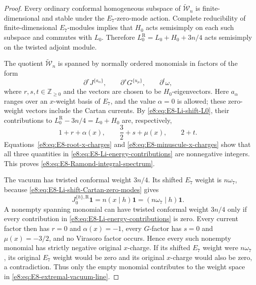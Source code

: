 \documentclass[11pt,reqno]{amsart}
\theoremstyle{definition}
\theoremstyle{remark}
\providecommand{\Z}{\mathbb{Z}}
\providecommand{\Vac}{\mathbf{1}}
\providecommand{\W}{\mathcal{W}}
\begin{document}
\begin{proof}
Every ordinary conformal homogeneous subspace of $\widetilde{\W}_n$ is
finite-dimensional and stable under the $E_7$-zero-mode action.  Complete
reducibility of finite-dimensional $E_7$-modules implies that $H_0$ acts
semisimply on each such subspace and commutes with $L_0$.  Therefore
$L_0^{\mathrm R}=L_0+H_0+3n/4$ acts semisimply on the twisted adjoint
module.

The quotient $\widetilde{\W}_n$ is spanned by normally ordered monomials in
factors of the form
\begin{equation*}
  \partial^rJ^{\{a_\alpha\}},
  \qquad
  \partial^sG^{\{u_\mu\}},
  \qquad
  \partial^t\omega,
\end{equation*}
where $r,s,t\in\Z_{\ge0}$ and the vectors are chosen to be $H_0$-eigenvectors.
Here $a_{\alpha}$ ranges over an $x$-weight basis of $E_7$, and the value
$\alpha=0$ is allowed; these zero-weight vectors include the Cartan currents.
By \eqref{e8:eq:E8-Li-shift-L0}, their contributions to
$L_0^{\mathrm R}-3n/4=L_0+H_0$ are, respectively,
\begin{equation}
  1+r+\alpha(x),
  \qquad
  \frac32+s+\mu(x),
  \qquad
  2+t.
  \label{e8:eq:E8-Li-energy-contributions}
\end{equation}
Equations~\eqref{e8:eq:E8-root-x-charges} and
\eqref{e8:eq:E8-minuscule-x-charges} show that all three quantities in
\eqref{e8:eq:E8-Li-energy-contributions} are nonnegative integers.  This proves
\eqref{e8:eq:E8-Ramond-integral-spectrum}.

The vacuum has twisted conformal weight $3n/4$.  Its shifted $E_7$ weight is
$n\omega_7$, because \eqref{e8:eq:E8-Li-shift-Cartan-zero-modes} gives
\begin{equation*}
  J_0^{\{h\},\mathrm R}\Vac
  =n(x\mid h)\Vac
  =(n\omega_7\mid h)\Vac.
\end{equation*}
A nonempty spanning monomial can have twisted conformal weight $3n/4$ only
if every contribution in \eqref{e8:eq:E8-Li-energy-contributions} is zero.
Every current factor then has $r=0$ and $\alpha(x)=-1$, every $G$-factor has
$s=0$ and $\mu(x)=-3/2$, and no Virasoro factor occurs.  Hence every such
nonempty monomial has strictly negative original $x$-charge.  If its shifted
$E_7$ weight were $n\omega_7$, its original $E_7$ weight would be zero and
its original $x$-charge would also be zero, a contradiction.  Thus only the
empty monomial contributes to the weight space in
\eqref{e8:eq:E8-extremal-vacuum-line}.
\end{proof}
\end{document}
